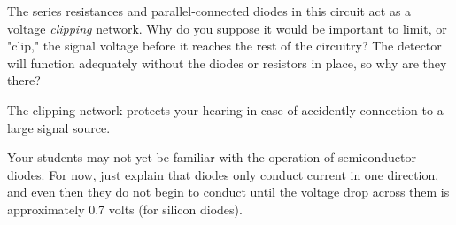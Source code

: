

The series resistances and parallel-connected diodes in this circuit act as a voltage {\it clipping} network.  Why do you suppose it would be important to limit, or "clip," the signal voltage before it reaches the rest of the circuitry?  The detector will function adequately without the diodes or resistors in place, so why are they there?







The clipping network protects your hearing in case of accidently connection to a large signal source.







Your students may not yet be familiar with the operation of semiconductor diodes.  For now, just explain that diodes only conduct current in one direction, and even then they do not begin to conduct until the voltage drop across them is approximately 0.7 volts (for silicon diodes).



